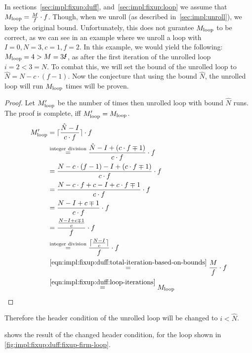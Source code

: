 In sections~\ref{sec:impl:fixup:duff}, and~\ref{sec:impl:fixup:loop} we assume that $M_{\text{loop}} = \frac{M}{f} \cdot f$.
Though, when we unroll (as described in~\cref{sec:impl:unroll}), we keep the original bound.
Unfortunately, this does not gurantee $M_{\text{loop}}$ to be correct, as we can see in an example where we unroll a loop with $I = 0, N = 3, c = 1, f = 2$.
In this example, we would yield the following: $\Mloop = 4 > M = 3 \mLightning$, as after the first iteration of the unrolled loop $i = 2 < 3 = N$.
To combat this, we will set the bound of the unrolled loop to $\hat{N} = N - c \cdot (f - 1)$.
Now the conjecture that using the bound $\hat{N}$, the unrolled loop will run $M_{\text{loop}}$ times will be proven.
\begin{proof}
    Let $M_{\text{loop}}'$ be the number of times then unrolled loop with bound $\hat{N}$ runs.
    The proof is complete, iff $M_{\text{loop}}' = M_{\text{loop}}$.
    \begin{align*}
        M_{\text{loop}}' &= \lceil{}\frac{\hat{N} - I}{c \cdot f}\rceil{} \cdot f\\
        &\overset{\text{integer division}}{=} \frac{\hat{N} - I + (c \cdot f \mp 1)}{c \cdot f} \cdot f\\
        &= \frac{N - c \cdot (f - 1) - I + (c \cdot f \mp 1)}{c \cdot f} \cdot f\\
        &= \frac{N - c \cdot f + c - I + c \cdot f \mp 1}{c \cdot f} \cdot f\\
        &= \frac{N - I + c \mp 1}{c \cdot f} \cdot f\\
        &= \frac{\frac{N - I + c \mp 1}{c}}{f} \cdot f\\
        &\overset{\text{integer division}}{=} \frac{\lceil{}\frac{N - I}{c}\rceil{}}{f} \cdot f\\
        &\overset{\ref{eqn:impl:fixup:duff:total-iteration-based-on-bounds}}{=} \frac{M}{f} \cdot f\\
        &\overset{\ref{eqn:impl:fixup:duff:loop-iterations}}{=} M_{\text{loop}}
    \end{align*}
\end{proof}

Therefore the header condition of the unrolled loop will be changed to $i < \hat{N}$.

 shows the result of the changed header condition, for the loop shown in \cref{fig:impl:fixup:duff:fixup-firm-loop}.

